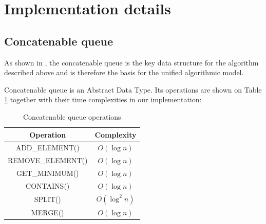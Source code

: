 \documentclass[a4paper,english,numberwithinsect,notab]{eurocg20-submission}
\begin{document}
\section{Implementation details}
\label{sec:implementation-details}
\subsection{Concatenable queue}

	As shown in \cite{overmars}, the concatenable queue is the key data structure for the algorithm described above and is therefore the basis for the unified algorithmic model.
	
	Concatenable queue is an Abstract Data Type. Its operations are shown on Table \ref{table:cqueue-operations} together with their time complexities in our implementation:
	
	\begin{table}[htbp]
		\caption{Concatenable queue operations}
		\label{table:cqueue-operations}
		\begin{center}
			\begin{tabular}{|c|c|}
				\hline
				\textbf{Operation} & \textbf{Complexity} \\
				\hline
				ADD\_ELEMENT() & $O(\log n)$ \\
				\hline
				REMOVE\_ELEMENT() & $O(\log n)$ \\
				\hline
				GET\_MINIMUM() & $O(\log n)$ \\
				\hline
				CONTAINS() & $O(\log n)$ \\
				\hline
				SPLIT() & $O(\log^2 n)$ \\
				\hline
				MERGE() & $O(\log n)$ \\
				\hline
			\end{tabular} 
		\end{center}
	\end{table} 
	
	
	
	
\end{document}
